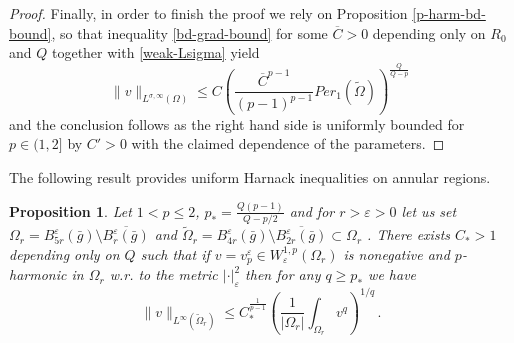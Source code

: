 \documentclass[10pt]{amsart}
\numberwithin{equation}{section}
\newtheorem{proposition}[theorem]{Proposition}
\theoremstyle{definition}
\begin{document}
\begin{proof}
Finally, in order to finish the proof we rely on Proposition \ref{p-harm-bd-bound}, so that inequality \eqref{bd-grad-bound} for some $\overline{C}>0$ depending only on $R_0$ and $Q$ together with \eqref{weak-Lsigma} yield 
\[ \| v \|_{L^{\sigma,\infty}(\Omega)} \leq C \left( \frac{\overline{C}^{p-1}}{(p-1)^{p-1}}Per_1(\widetilde{\Omega})\right)^{\frac{Q}{Q-p}} \, \]
and the conclusion follows as the right hand side is uniformly bounded for $p \in (1,2]$ by $C'>0$ with the claimed dependence of the parameters.
\end{proof}

The following result provides uniform Harnack inequalities on annular regions.

\begin{proposition}
\label{annular-harnack}
Let  $1<p\leq 2$, $p_*=\frac{Q(p-1)}{Q-p/2}$ and for $r>\varepsilon>0$ let us set $\Omega_r= B^\varepsilon_{5r}(\bar{g}) \setminus \overline{B^\varepsilon_r(\bar{g})}$ and $\widetilde{\Omega}_r=B^\varepsilon_{4r}(\bar{g}) \setminus \overline{B^\varepsilon_{2r}(\bar{g})} \subset \Omega_r$ . 
There exists $C_*>1$ depending only on $Q$ such that if $v=v^\varepsilon_p \in W^{1,p}_{\varepsilon} (\Omega_r)$ is nonegative and $p$-harmonic in $\Omega_r$ w.r. to the metric $|\cdot|^2_\varepsilon$ then for any $q \geq p_*$ we have
\begin{equation}
\label{Inv-harnack}
\| v\|_{L^\infty(\widetilde{\Omega}_r)} \leq C_*^{\frac{1}{p-1}}  \left( \frac{1}{|\Omega_r |} \int_{\Omega_r}v^q \right)^{1/q} \, .
\end{equation}

\end{proposition}
\end{document}
